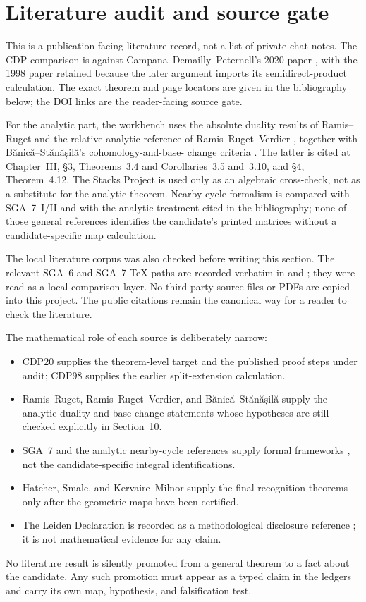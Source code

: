 \section{Literature audit and source gate}

This is a publication-facing literature record, not a list of private chat
notes.  The CDP comparison is against Campana--Demailly--Peternell's 2020
paper \cite[Theorem~2.2 and Corollary~2.3, p.~680]{CDP2020}, with the 1998
paper \cite[Lemma~3.2, pp.~84--85]{CDP1998} retained because the later argument imports its
semidirect-product calculation.  The exact theorem and page locators are
given in the bibliography below; the DOI links are the reader-facing source
gate.

For the analytic part, the workbench uses the absolute duality results of
Ramis--Ruget \cite[Theorems~1--2 and Proposition~2, pp.~81--91]{RamisRuget1970}
and the relative analytic reference of
Ramis--Ruget--Verdier \cite{RamisRugetVerdier1971}, together with
Bănică--Stănășilă's cohomology-and-base-
change criteria \cite{BanicaStanasila1976}.  The latter is cited at Chapter~III, §3, Theorems~3.4 and
Corollaries~3.5 and~3.10, and §4, Theorem~4.12.  The Stacks Project is used
only as an algebraic cross-check, not as a substitute for the analytic
theorem.  Nearby-cycle formalism is compared with SGA~7~I/II and with the
analytic treatment cited in the bibliography; none of those general
references identifies the candidate's printed matrices without a
candidate-specific map calculation.

The local literature corpus was also checked before writing this section.
The relevant SGA~6 and SGA~7 TeX paths are recorded verbatim in
 and
; they were read as a local comparison
layer.  No third-party source files or PDFs are copied into this project.  The
public citations remain the canonical way for a reader to check the literature.

The mathematical role of each source is deliberately narrow:

\begin{itemize}[leftmargin=1.8em]
\item CDP20 supplies the theorem-level target and the published proof steps
under audit; CDP98 supplies the earlier split-extension calculation.
\item Ramis--Ruget, Ramis--Ruget--Verdier, and Bănică--Stănășilă supply the
analytic duality and base-change statements whose hypotheses are still
checked explicitly in Section~10.
\item SGA~7 and the analytic nearby-cycle references supply formal
frameworks \cite{SGA7I1972,SGA7II1973}, not the candidate-specific integral identifications.
\item Hatcher, Smale, and Kervaire--Milnor supply the final recognition
theorems \cite{Hatcher2002,Smale1961,KervaireMilnor1963} only after the geometric maps have been certified.
\item The Leiden Declaration is recorded as a methodological disclosure
reference \cite{Leiden2026}; it is not mathematical evidence for any claim.
\end{itemize}

No literature result is silently promoted from a general theorem to a fact
about the candidate.  Any such promotion must appear as a typed claim in the
ledgers and carry its own map, hypothesis, and falsification test.
